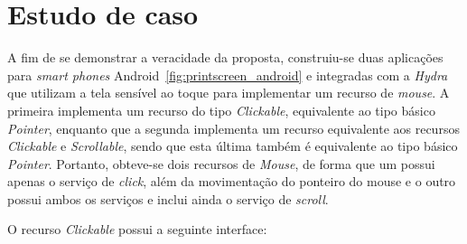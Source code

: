 \section{Estudo de caso}
\label{sec:estudoDeCaso}

A fim de se demonstrar a veracidade da proposta, construiu-se duas aplicações para \emph{smart phones} Android~\ref{fig:printscreen_android} e integradas com a \emph{Hydra} que utilizam a tela sensível ao toque para implementar um recurso de \emph{mouse}. A primeira implementa um recurso do tipo \emph{Clickable}, equivalente ao tipo básico \emph{Pointer}, enquanto que a segunda implementa um recurso equivalente aos recursos \emph{Clickable} e \emph{Scrollable}, sendo que esta última também é equivalente ao tipo básico \emph{Pointer}. Portanto, obteve-se dois recursos de \emph{Mouse}, de forma que um possui apenas o serviço de \emph{click}, além da movimentação do ponteiro do mouse e o outro possui ambos os serviços e inclui ainda o serviço de \emph{scroll}. 

O recurso \emph{Clickable} possui a seguinte interface:

